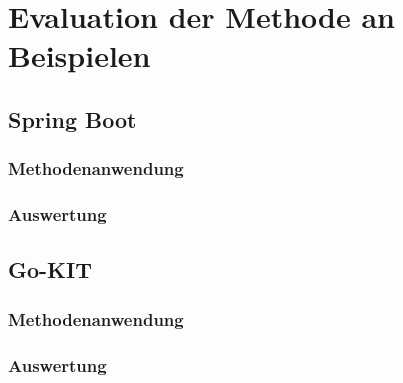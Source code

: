 \section{Evaluation der Methode an Beispielen}

\subsection{Spring Boot}
\subsubsection{Methodenanwendung}
\subsubsection{Auswertung}

\subsection{Go-KIT}
\subsubsection{Methodenanwendung}
\subsubsection{Auswertung}
